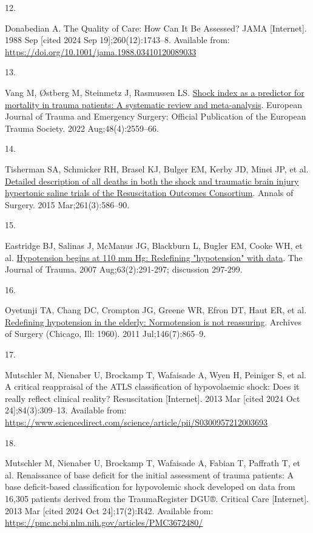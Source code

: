 \documentclass[
]{article}
\newlength{\cslhangindent}
\newlength{\csllabelwidth}
\newlength{\cslentryspacingunit} %
\newenvironment{CSLReferences}[2] %
 {%
  \setlength{\parindent}{0pt}
  \ifodd #1
  \let\oldpar\par
  \def\par{\hangindent=\cslhangindent\oldpar}
  \fi
  \setlength{\parskip}{#2\cslentryspacingunit}
 }%
 {}
\newcommand{\CSLLeftMargin}[1]{\parbox[t]{\csllabelwidth}{#1}}
\newcommand{\CSLRightInline}[1]{\parbox[t]{\linewidth - \csllabelwidth}{#1}\break}
\begin{document}
\begin{CSLReferences}{0}{0}
\leavevmode{}%
\CSLLeftMargin{12. }%
\CSLRightInline{Donabedian A. The {Quality} of {Care}: {How} {Can} {It}
{Be} {Assessed}? JAMA {[}Internet{]}. 1988 Sep {[}cited 2024 Sep
19{]};260(12):1743--8. Available from:
\url{https://doi.org/10.1001/jama.1988.03410120089033}}

\leavevmode{}%
\CSLLeftMargin{13. }%
\CSLRightInline{Vang M, Østberg M, Steinmetz J, Rasmussen LS.
\href{https://doi.org/10.1007/s00068-022-01932-z}{Shock index as a
predictor for mortality in trauma patients: A systematic review and
meta-analysis}. European Journal of Trauma and Emergency Surgery:
Official Publication of the European Trauma Society. 2022
Aug;48(4):2559--66. }

\leavevmode{}%
\CSLLeftMargin{14. }%
\CSLRightInline{Tisherman SA, Schmicker RH, Brasel KJ, Bulger EM, Kerby
JD, Minei JP, et al.
\href{https://doi.org/10.1097/SLA.0000000000000837}{Detailed description
of all deaths in both the shock and traumatic brain injury hypertonic
saline trials of the {Resuscitation} {Outcomes} {Consortium}}. Annals of
Surgery. 2015 Mar;261(3):586--90. }

\leavevmode{}%
\CSLLeftMargin{15. }%
\CSLRightInline{Eastridge BJ, Salinas J, McManus JG, Blackburn L, Bugler
EM, Cooke WH, et al.
\href{https://doi.org/10.1097/TA.0b013e31809ed924}{Hypotension begins at
110 mm {Hg}: Redefining "hypotension" with data}. The Journal of Trauma.
2007 Aug;63(2):291-297; discussion 297-299. }

\leavevmode{}%
\CSLLeftMargin{16. }%
\CSLRightInline{Oyetunji TA, Chang DC, Crompton JG, Greene WR, Efron DT,
Haut ER, et al.
\href{https://doi.org/10.1001/archsurg.2011.154}{Redefining hypotension
in the elderly: Normotension is not reassuring}. Archives of Surgery
(Chicago, Ill: 1960). 2011 Jul;146(7):865--9. }

\leavevmode{}%
\CSLLeftMargin{17. }%
\CSLRightInline{Mutschler M, Nienaber U, Brockamp T, Wafaisade A, Wyen
H, Peiniger S, et al. A critical reappraisal of the {ATLS}
classification of hypovolaemic shock: {Does} it really reflect clinical
reality? Resuscitation {[}Internet{]}. 2013 Mar {[}cited 2024 Oct
24{]};84(3):309--13. Available from:
\url{https://www.sciencedirect.com/science/article/pii/S0300957212003693}}

\leavevmode{}%
\CSLLeftMargin{18. }%
\CSLRightInline{Mutschler M, Nienaber U, Brockamp T, Wafaisade A, Fabian
T, Paffrath T, et al. Renaissance of base deficit for the initial
assessment of trauma patients: A base deficit-based classification for
hypovolemic shock developed on data from 16,305 patients derived from
the {TraumaRegister} {DGU}®. Critical Care {[}Internet{]}. 2013 Mar
{[}cited 2024 Oct 24{]};17(2):R42. Available from:
\url{https://pmc.ncbi.nlm.nih.gov/articles/PMC3672480/}}

\end{CSLReferences}
\end{document}
